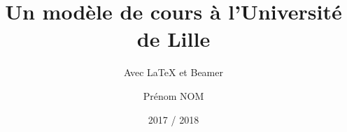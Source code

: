 \title{Un modèle de cours à l'Université de Lille}
\subtitle{Avec \LaTeX{} et Beamer}
\author{Prénom NOM}
\date{2017 / 2018}
